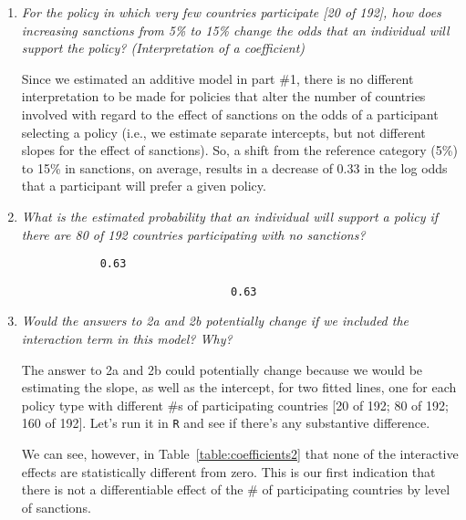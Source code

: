 \documentclass[12pt,letterpaper]{article}
\begin{document}
\begin{enumerate}
\begin{enumerate}
		
		\item
		\textit{For the policy in which very few countries participate [20 of 192], how does increasing sanctions from 5\% to 15\% change the odds that an individual will support the policy? (Interpretation of a coefficient)} 
		
		Since we estimated an additive model in part \#1, there is no different interpretation to be made for policies that alter the number of countries involved with regard to the effect of sanctions on the odds of a participant selecting a policy (i.e., we estimate separate intercepts, but not different slopes for the effect of sanctions). So, a shift from the reference category (5\%) to 15\% in sanctions, on average, results in a decrease of 0.33 in the log odds that a participant will prefer a given policy.
		
		\item
		\textit{What is the estimated probability that an individual will support a policy if there are 80 of 192 countries participating with no sanctions? }
		
			 
			
			\begin{verbatim}
			0.63 
			\end{verbatim}
			
						 
						
						\begin{verbatim}
								0.63 
						\end{verbatim}
		
		\item
		\textit{Would the answers to 2a and 2b potentially change if we included the interaction term in this model? Why? }
		
		The answer to 2a and 2b could potentially change because we would be estimating the slope, as well as the intercept, for two fitted lines, one for each policy type with different \#s of participating countries [20 of 192; 80 of 192; 160 of 192]. Let’s run it in \texttt{R} and see if there’s any substantive difference.
		
					 
		
		We can see, however, in Table~\ref{table:coefficients2} that none of the interactive effects are statistically different from zero. This is our first indication that there is not a differentiable effect of the \# of participating countries by level of sanctions.
		

\end{enumerate}
\end{enumerate}
\end{document}
